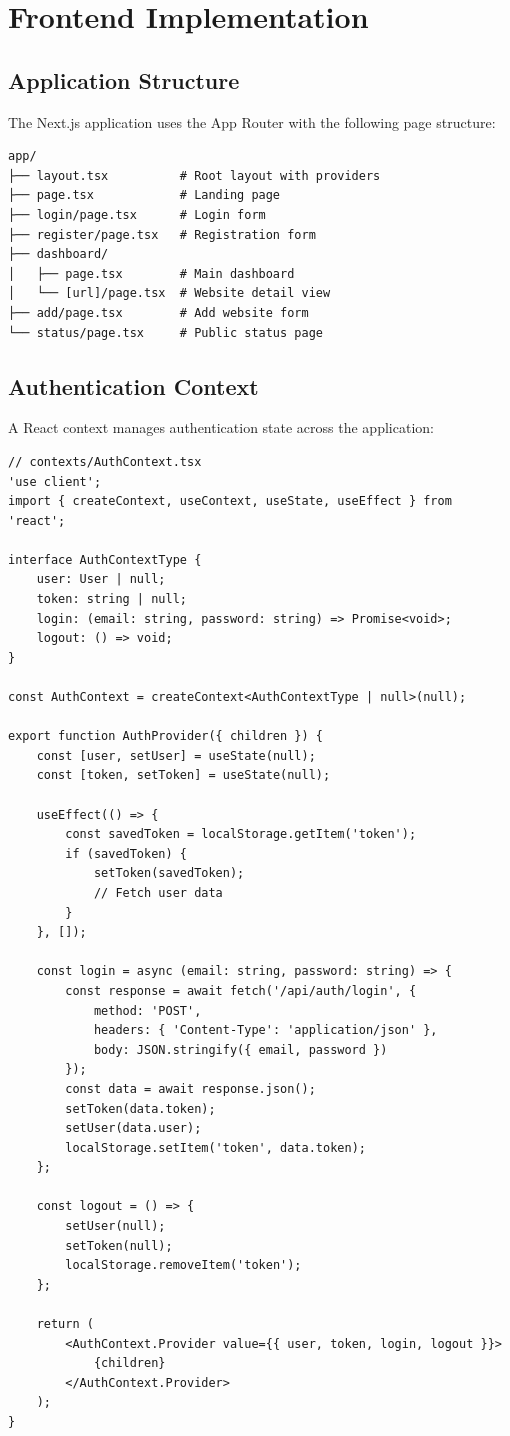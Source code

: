 \section{Frontend Implementation}

\subsection{Application Structure}

The Next.js application uses the App Router with the following page structure:

\begin{verbatim}
app/
├── layout.tsx          # Root layout with providers
├── page.tsx            # Landing page
├── login/page.tsx      # Login form
├── register/page.tsx   # Registration form
├── dashboard/
│   ├── page.tsx        # Main dashboard
│   └── [url]/page.tsx  # Website detail view
├── add/page.tsx        # Add website form
└── status/page.tsx     # Public status page
\end{verbatim}

\subsection{Authentication Context}

A React context manages authentication state across the application:

\begin{verbatim}
// contexts/AuthContext.tsx
'use client';
import { createContext, useContext, useState, useEffect } from 'react';

interface AuthContextType {
    user: User | null;
    token: string | null;
    login: (email: string, password: string) => Promise<void>;
    logout: () => void;
}

const AuthContext = createContext<AuthContextType | null>(null);

export function AuthProvider({ children }) {
    const [user, setUser] = useState(null);
    const [token, setToken] = useState(null);
    
    useEffect(() => {
        const savedToken = localStorage.getItem('token');
        if (savedToken) {
            setToken(savedToken);
            // Fetch user data
        }
    }, []);
    
    const login = async (email: string, password: string) => {
        const response = await fetch('/api/auth/login', {
            method: 'POST',
            headers: { 'Content-Type': 'application/json' },
            body: JSON.stringify({ email, password })
        });
        const data = await response.json();
        setToken(data.token);
        setUser(data.user);
        localStorage.setItem('token', data.token);
    };
    
    const logout = () => {
        setUser(null);
        setToken(null);
        localStorage.removeItem('token');
    };
    
    return (
        <AuthContext.Provider value={{ user, token, login, logout }}>
            {children}
        </AuthContext.Provider>
    );
}
\end{verbatim}

